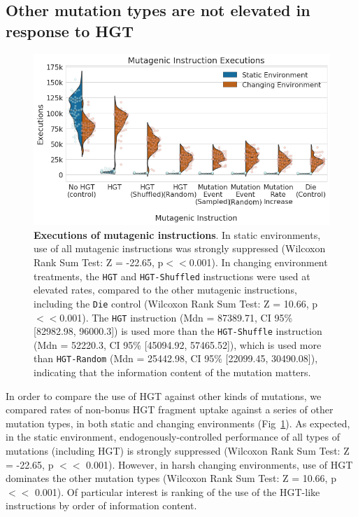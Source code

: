 \documentclass[PhD]{msu-thesis}
\begin{document}
\subsection{Other mutation types are not elevated in response to HGT}
	\begin{figure}[h!]
	\begin{center}
	\includegraphics[width=0.95\columnwidth]{figures/HGT/mutagen_execution.png}
	\caption{\textbf{Executions of mutagenic instructions}. In static environments, use of all mutagenic instructions was strongly suppressed (Wilcoxon Rank Sum Test: Z = -22.65, p$<<$0.001). In changing environment treatments, the \texttt{HGT} and \texttt{HGT-Shuffled} instructions were used at elevated rates, compared to the other mutagenic instructions, including the \texttt{Die} control (Wilcoxon Rank Sum Test:
	Z = 10.66, p$<<$0.001). The \texttt{HGT} instruction (Mdn = 87389.71, CI 95\% [82982.98, 96000.3]) is used more than the \texttt{HGT-Shuffle} instruction (Mdn = 52220.3, CI 95\% [45094.92, 57465.52]), which is used more than \texttt{HGT-Random} (Mdn
	= 25442.98, CI 95\% [22099.45, 30490.08]), indicating that the information content of the mutation matters. 
	}\label{fig:mutagen_execution}
	\end{center}
	\end{figure}
In order to compare the use of HGT against other kinds of mutations, we compared rates of non-bonus HGT fragment uptake against a series of other mutation types, in both static and changing environments (Fig~\ref{fig:mutagen_execution}). As expected, in the static environment, endogenously-controlled performance of all types of mutations (including HGT) is strongly suppressed (Wilcoxon Rank Sum Test: Z = -22.65, p $<<$ 0.001). However, in harsh changing environments, use of HGT dominates the other mutation types (Wilcoxon Rank Sum Test: Z = 10.66, p $<<$ 0.001). Of particular interest is ranking of the use of the HGT-like instructions by order of information content. 
\end{document}
